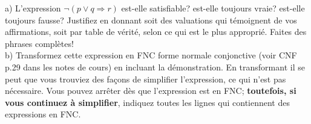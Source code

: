 \documentclass[12pt]{article}
\newcommand{\REMISE}[1]{}
\newcommand{\rouge}[1]{\textcolor{red}{#1}}
\newcommand{\blanc}[1]{\textcolor{white}{#1}}
\newcommand{\V}{\mbox{\tt v}}
\newcommand{\F}{\mbox{\tt f}}
\newcommand{\non}{\neg}                  %
\newcommand{\ou}{\vee}                   %
\newcommand{\implique}{\Rightarrow}      %
\newcommand{\ssi}{\Leftrightarrow}       %
\newcommand{\cqfd}{\blanc{.}\\[-2mm]\mbox{}\hfill {\bf C.Q.F.D.}\\} %
\newcommand{\EQUIVALENT}[1]{ \quad \left\langle \mbox{ \it #1 } \right\rangle }
\newcounter{exercice}\newcommand{\exercice}{\bigskip \addtocounter{exercice}{1}\noindent \textbf{Exercice \theexercice}\\}
\newcommand{\reponse}[1]{\REMISE{\vspace{.5cm}\noindent\textbf{Réponse : } #1 \vfill}}
\begin{document}
%
\exercice
a) L'expression $\non (p \ou q\implique  r) $ est-elle satisfiable? est-elle toujours vraie?  est-elle toujours fausse? Justifiez   en donnant soit des valuations qui témoignent de vos affirmations, soit par table de vérité, selon ce qui est le plus approprié. Faites des phrases complètes!
\\
b) Transformez cette expression en FNC forme normale conjonctive (voir CNF p.29 dans les notes de cours) en incluant la démonstration. En transformant il se peut que vous trouviez des façons de simplifier l'expression, ce qui n'est pas nécessaire. Vous pouvez arrêter dès que l'expression est en FNC;  \textbf{toutefois, si vous continuez à simplifier}, indiquez toutes les lignes qui contiennent des expressions en FNC.
\reponse{
}
\vfill




%
\end{document}
